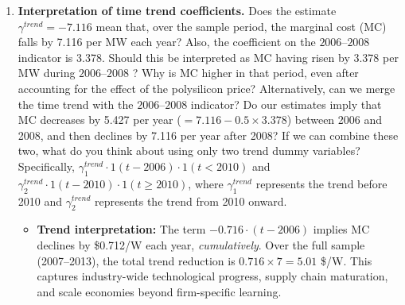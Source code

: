 \documentclass[12pt]{article}
\begin{document}
\begin{enumerate}
    {\color{answerblue}

    In the model's preferred log specification, $\ln(e^{GW}+1)$, the mean values are 0.118 (c-Si) and 0.050 (thin-film). These are the values that enter the marginal cost function multiplied by $\gamma_{\text{exp}}^{\tau}$. 
    
    The c-Si mean experience rises sharply in the later years (0.025 GW in 2008 to 0.683 GW in 2013), reflecting the massive production scale-up. It should be noted that a few large firms drive the mean well above the median. The median c-Si firm has only $\sim 3$ MW of cumulative experience, while the mean is 251 MW, reflecting the dominance of a handful of large producers. obviously, thin-film firms have much lower experience on average. We may not even be able to measure the effect correctly because of how low it is and because we really don't observe the large thin-film firms we do for c-Si.}

    \item \textbf{Interpretation of time trend coefficients.} Does the estimate $\gamma^{trend} = -7.116$ mean that, over the sample period, the marginal cost (MC) falls by 7.116 per MW each year? Also, the coefficient on the $2006–2008$ indicator is 3.378. Should this be interpreted as MC having risen by 3.378 per MW during $2006–2008$ ? Why is MC higher in that period, even after accounting for the effect of the polysilicon price? Alternatively, can we merge the time trend with the $2006–2008$ indicator? Do our estimates imply that MC decreases by 5.427 per year ($ = 7.116 - 0.5 \times 3.378 $) between 2006 and 2008, and then declines by 7.116 per year after 2008? If we can combine these two, what do you think about using only two trend dummy variables? Specifically, $\gamma_1^{trend} \cdot 1(t-2006) \cdot 1(t<2010)$ and $\gamma_2^{trend} \cdot 1(t-2010) \cdot 1(t \geq 2010)$, where $\gamma_1^{trend}$ represents the trend before 2010 and $\gamma_2^{trend}$ represents the trend from 2010 onward.

    {\color{answerblue}

    \begin{itemize}[leftmargin=2em]
        \item \textbf{Trend interpretation:} The term $-0.716 \cdot (t - 2006)$ implies MC declines by \$0.712/W each year, \textit{cumulatively}. Over the full sample (2007--2013), the total trend reduction is $0.716 \times 7 = 5.01$ \$/W. This captures industry-wide technological progress, supply chain maturation, and scale economies beyond firm-specific learning.


\end{itemize}}
\end{enumerate}
\end{document}
